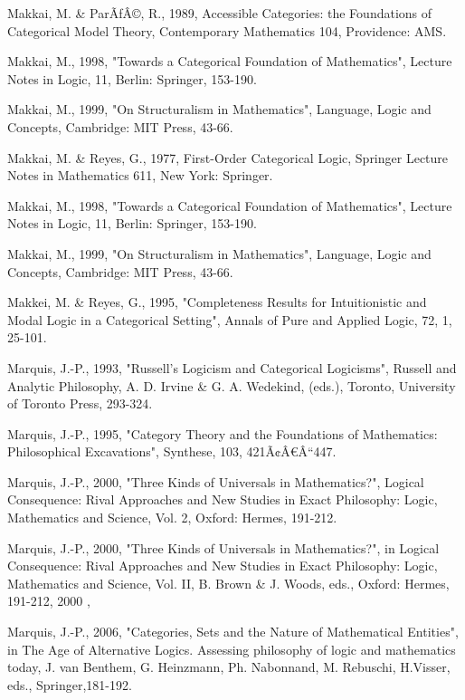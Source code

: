 \documentclass[12pt]{article}
\begin{document}
\begin{thebibliography}{199}
Makkai, M. \& ParÃƒÂ©, R., 1989, Accessible Categories: the Foundations of Categorical Model Theory, Contemporary Mathematics 104, Providence: AMS. 

Makkai, M., 1998, "Towards a Categorical Foundation of Mathematics", Lecture Notes in Logic, 11, Berlin: Springer, 
153-190. 

Makkai, M., 1999, "On Structuralism in Mathematics", Language, Logic and Concepts, Cambridge: MIT Press, 43-66. 

Makkai, M. \& Reyes, G., 1977, First-Order Categorical Logic, Springer Lecture Notes in Mathematics 611, New York: Springer. 

Makkai, M., 1998, "Towards a Categorical Foundation of Mathematics", Lecture Notes in Logic, 11, 
Berlin: Springer, 153-190. 

Makkai, M., 1999, "On Structuralism in Mathematics", Language, Logic and Concepts, Cambridge: 
MIT Press, 43-66. 

Makkei, M. \& Reyes, G., 1995, "Completeness Results for Intuitionistic and Modal Logic in a Categorical Setting", Annals of Pure and Applied Logic, 72, 1, 25-101. 

Marquis, J.-P., 1993, "Russell's Logicism and Categorical Logicisms", Russell and Analytic Philosophy, A. D. Irvine \& G. A. Wedekind, (eds.), Toronto, University of Toronto Press, 293-324.

Marquis, J.-P., 1995, "Category Theory and the Foundations of Mathematics: Philosophical Excavations", Synthese, 103, 421Ã¢Â€Â“447. 

Marquis, J.-P., 2000, "Three Kinds of Universals in Mathematics?", Logical Consequence: Rival Approaches and New Studies in Exact Philosophy: Logic, Mathematics and Science, Vol. 2, Oxford: Hermes, 191-212. 

Marquis, J.-P., 2000, "Three Kinds of Universals in Mathematics?", in Logical Consequence: Rival Approaches and New Studies in Exact Philosophy: Logic, Mathematics and Science, Vol. II, B. Brown \& J. Woods, eds., 
Oxford: Hermes, 191-212, 2000 ,

Marquis, J.-P., 2006, "Categories, Sets and the Nature of Mathematical Entities", in The Age of Alternative Logics. Assessing philosophy of logic and mathematics today, J. van Benthem, G. Heinzmann, Ph. Nabonnand, M. Rebuschi, H.Visser, eds., Springer,181-192. 


\end{thebibliography}
\end{document}
